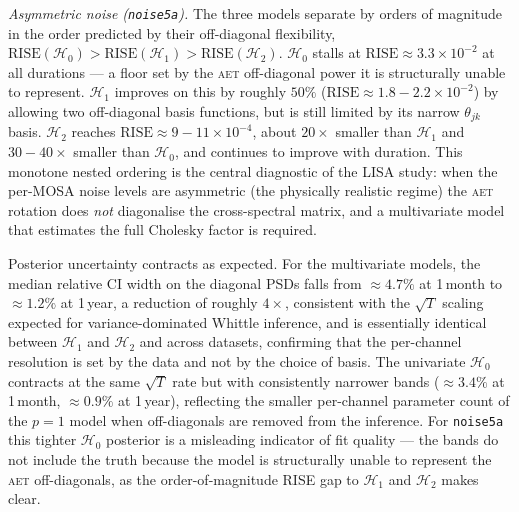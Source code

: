 \documentclass[%
	reprint,
	nofootinbib,
	amsmath,
	amssymb,
	aps,
]{revtex4-2}
\newcommand{\AET}{\textsc{aet}\xspace}
\begin{document}
	\emph{Asymmetric noise (\texttt{noise5a}).} The three models
	separate by orders of magnitude in the order predicted by their
	off-diagonal flexibility,
	$\mathrm{RISE}(\mathcal{H}_{0})\!>\!\mathrm{RISE}(\mathcal{H}_{1})\!>\!\mathrm{RISE}(\mathcal{H}_{2})$.
	$\mathcal{H}_{0}$ stalls at
	$\mathrm{RISE}\approx 3.3\!\times\!10^{-2}$ at all durations ---
	a floor set by the \AET off-diagonal power it is structurally
	unable to represent. $\mathcal{H}_{1}$ improves on this by
	roughly $50\%$
	($\mathrm{RISE}\approx 1.8\!-\!2.2\!\times\!10^{-2}$) by
	allowing two off-diagonal basis functions, but is still limited
	by its narrow $\theta_{jk}$ basis. $\mathcal{H}_{2}$ reaches
	$\mathrm{RISE}\approx 9\!-\!11\!\times\!10^{-4}$, about
	$20\times$ smaller than $\mathcal{H}_{1}$ and $30\!-\!40\times$
	smaller than $\mathcal{H}_{0}$, and continues to improve with
	duration. This monotone nested ordering is the central diagnostic
	of the LISA study: when the per-MOSA noise levels are asymmetric
	(the physically realistic regime) the \AET rotation does
	\emph{not} diagonalise the cross-spectral matrix, and a
	multivariate model that estimates the full Cholesky factor is
	required.

	Posterior uncertainty contracts as expected. For the multivariate
	models, the median relative CI width on the diagonal PSDs falls
	from $\approx\!4.7\%$ at 1\,month to $\approx\!1.2\%$ at 1\,year,
	a reduction of roughly $4\times$, consistent with the $\sqrt{T}$
	scaling expected for variance-dominated Whittle inference, and is
	essentially identical between $\mathcal{H}_{1}$ and
	$\mathcal{H}_{2}$ and across datasets, confirming that the
	per-channel resolution is set by the data and not by the choice
	of basis. The univariate $\mathcal{H}_{0}$ contracts at the same
	$\sqrt{T}$ rate but with consistently narrower bands
	($\approx\!3.4\%$ at 1\,month, $\approx\!0.9\%$ at 1\,year),
	reflecting the smaller per-channel parameter count of the $p=1$
	model when off-diagonals are removed from the inference. For
	\texttt{noise5a} this tighter $\mathcal{H}_{0}$ posterior is a
	misleading indicator of fit quality --- the bands do not include
	the truth because the model is structurally unable to represent
	the \AET off-diagonals, as the order-of-magnitude RISE gap to
	$\mathcal{H}_{1}$ and $\mathcal{H}_{2}$ makes clear.
\end{document}
